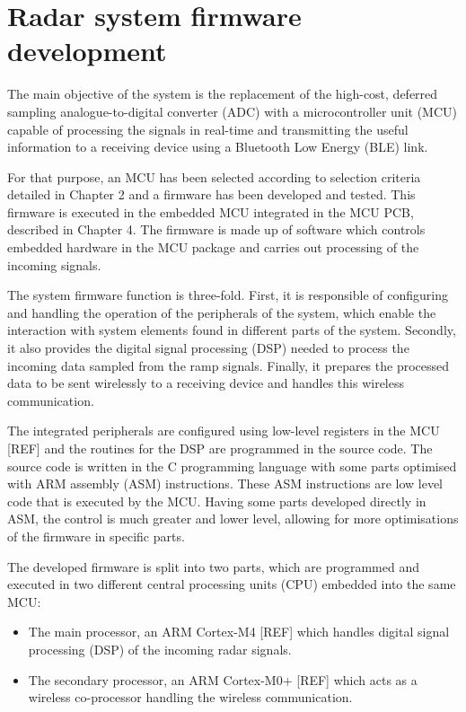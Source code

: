 \chapter{Radar system firmware development}
The main objective of the system is the replacement of the high-cost, deferred sampling analogue-to-digital converter (ADC) with a microcontroller unit (MCU) capable of processing the signals in real-time and transmitting the useful information to a receiving device using a Bluetooth Low Energy (BLE) link.

For that purpose, an MCU has been selected according to selection criteria detailed in Chapter 2 and a firmware has been developed and tested. This firmware is executed in the embedded MCU integrated in the MCU PCB, described in Chapter 4. %
The firmware is made up of software which controls embedded hardware in the MCU package and carries out processing of the incoming signals.

The system firmware function is three-fold. First, it is responsible of configuring and handling the operation of the peripherals of the system, which enable the interaction with system elements found in different parts of the system. Secondly, it also provides the digital signal processing (DSP) needed to process the incoming data sampled from the ramp signals. Finally, it prepares the processed data to be sent wirelessly to a receiving device and handles this wireless communication.

The integrated peripherals are configured using low-level registers in the MCU [REF] and the routines for the DSP are programmed in the source code. The source code is written in the C programming language with some parts optimised with ARM assembly (ASM) instructions. These ASM instructions are low level code that is executed by the MCU. Having some parts developed directly in ASM, the control is much greater and lower level, allowing for more optimisations of the firmware in specific parts.

The developed firmware is split into two parts, which are programmed and executed in two different central processing units (CPU) embedded into the same MCU:
\begin{itemize}
	\item The main processor, an ARM Cortex-M4 [REF] which handles digital signal processing (DSP) of the incoming radar signals.
	\item The secondary processor, an ARM Cortex-M0+ [REF] which acts as a wireless co-processor handling the wireless communication.
\end{itemize}

